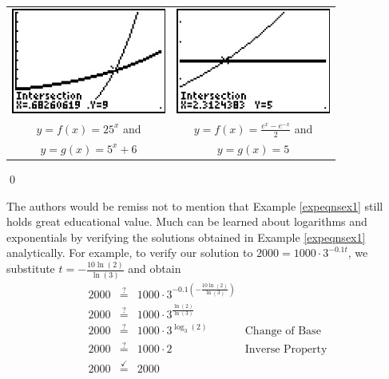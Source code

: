 \begin{ex}
\begin{enumerate}
\begin{center}

\begin{tabular}{cc}

\includegraphics[width=2in]{./ExpLogsGraphics/ExpEqns05.jpg} &

\hspace{0.75in} \includegraphics[width=2in]{./ExpLogsGraphics/ExpEqns06.jpg} \\

$y = f(x) = 25^{x}  $ and   & 

 \hspace{0.75in}  $y = f(x) = \frac{e^{x} - e^{-x}}{2}$ and \\
 
 \boldmath $y=g(x) = 5^{x} + 6$ & 
 \hspace{0.75in} \boldmath $y=g(x) = 5$  \\

\end{tabular}

\end{center}

\end{enumerate}

\qed

\end{ex}

The authors would be remiss not to mention that Example \ref{expeqnsex1} still holds great educational value.  Much can be learned about logarithms and exponentials by verifying the solutions obtained in Example \ref{expeqnsex1} analytically. For example, to verify our solution to  $2000 = 1000 \cdot 3^{-0.1 t}$, we substitute $t = -\frac{10\ln(2)}{\ln(3)}$ and obtain 
\[ \begin{array}{rclr}

2000 & \stackrel{?}{=} & 1000 \cdot 3^{-0.1 \left(-\frac{10\ln(2)}{\ln(3)}\right)} & \\
2000 & \stackrel{?}{=} & 1000 \cdot 3^{\frac{\ln(2)}{\ln(3)}} & \\
2000 & \stackrel{?}{=} & 1000 \cdot 3^{\log_{3}(2)} & \mbox{Change of Base}\\
2000 & \stackrel{?}{=} & 1000 \cdot 2 & \mbox{Inverse Property}\\
2000 & \stackrel{\checkmark}{=} & 2000 & \\

\end{array}\]

